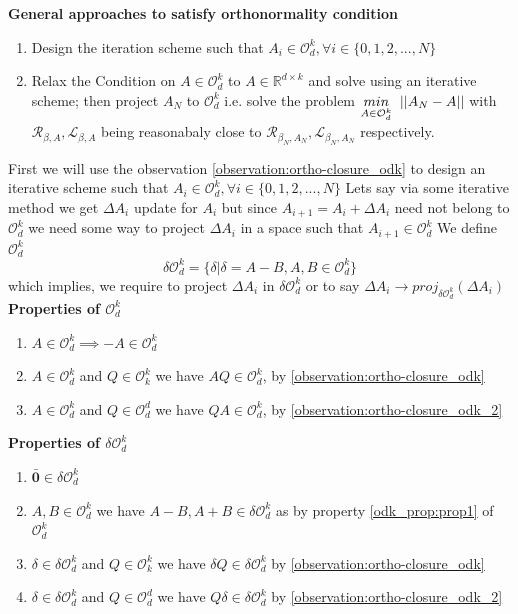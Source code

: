 \newline \newline \textbf{General approaches to satisfy orthonormality condition}
\begin{enumerate}
    \item Design the iteration scheme such that $A_i \in \mathcal{O}_d^k, \forall i \in \{0,1,2,...,N\}$
    \item Relax the Condition on $A \in \mathcal{O}_d^k$ to $A \in \mathbb{R}^{d\times k}$ and solve using an iterative scheme;  then project $A_{N}$ to $\mathcal{O}_d^k$ i.e. solve the problem $\underset{A \in \mathcal{O}_d^k}{min} \hspace{2mm} ||A_{N}-A||$ with $\mathcal{R}_{\beta, A}, \mathcal{L}_{\beta, A}$ being reasonabaly close to $\mathcal{R}_{\beta_{N}, A_{N}}, \mathcal{L}_{\beta_{N}, A_{N}}$ respectively.
\end{enumerate}
First we will use the observation \ref{observation:ortho-closure_odk} to design an iterative scheme such that $A_i \in \mathcal{O}_d^k, \forall i \in \{0,1,2,...,N\}$
\newline Lets say via some iterative method we get $\Delta A_i$ update for $A_i$ but since $A_{i+1} = A_i + \Delta A_i$ need not belong to $\mathcal{O}_d^k$ we need some way to project $\Delta A_i$ in a space such that $A_{i+1} \in \mathcal{O}_d^k$
\newline We define $\mathcal{O}_d^k$
\begin{equation}
    \delta \mathcal{O}_d^k = \{ \delta | \delta = A - B, A, B \in \mathcal{O}_d^k \}
\end{equation}
which implies, we require to project $\Delta A_i$ in $\delta \mathcal{O}_d^k $ or to say $\Delta A_i \to proj_{\delta \mathcal{O}_d^k}(\Delta A_i)$
\newline \newline \textbf{Properties of $\mathcal{O}_d^k $}
\begin{enumerate}
    \item $A \in \mathcal{O}_d^k \implies -A \in \mathcal{O}_d^k$ \label{odk_prop:prop1}
    \item $A \in \mathcal{O}_d^k$ and $Q\in \mathcal{O}_k^k$ we have $A Q \in \mathcal{O}_d^k$, by \ref{observation:ortho-closure_odk}
    \item $A \in \mathcal{O}_d^k$ and $Q\in \mathcal{O}_d^d$ we have $Q A \in \mathcal{O}_d^k$, by \ref{observation:ortho-closure_odk_2}
\end{enumerate}
\textbf{Properties of $\delta \mathcal{O}_d^k $}
\begin{enumerate}
    \item $\bar{\textbf{0}} \in \delta \mathcal{O}_d^k$
    \item $A, B \in \mathcal{O}_d^k$ we have $A-B, A+B \in \delta \mathcal{O}_d^k$ as by property \ref{odk_prop:prop1} of $\mathcal{O}_d^k$
    \item $\delta \in \delta \mathcal{O}_d^k$ and $Q\in \mathcal{O}_k^k$ we have $\delta Q \in \delta \mathcal{O}_d^k$ by \ref{observation:ortho-closure_odk}
    \item $\delta \in \delta \mathcal{O}_d^k$ and $Q\in \mathcal{O}_d^d$ we have $ Q\delta \in \delta \mathcal{O}_d^k$ by \ref{observation:ortho-closure_odk_2}
\end{enumerate}
